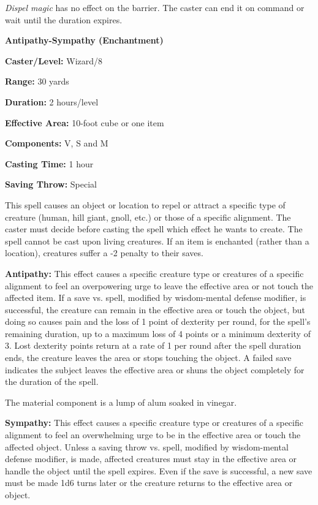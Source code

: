 \begin{multicols}{2}
\textit{Dispel magic} has no effect on the barrier.  The caster can end it on command or wait until the duration expires.

\vspace{1em}

\noindent
\begin{minipage}{\columnwidth}

\noindent \textbf{Antipathy-Sympathy (Enchantment)}

\noindent \textbf{Caster/Level:} Wizard/8

\noindent \textbf{Range:} 30 yards

\noindent \textbf{Duration:} 2 hours/level

\noindent \textbf{Effective Area:} 10-foot cube or one item

\noindent \textbf{Components:} V, S and M

\noindent \textbf{Casting Time:} 1 hour

\noindent \textbf{Saving Throw:} Special

\end{minipage}

This spell causes an object or location to repel or attract a specific type of creature (human, hill giant, gnoll, etc.) or those of a specific alignment.  The caster must decide before casting the spell which effect he wants to create.  The spell cannot be cast upon living creatures.  If an item is enchanted (rather than a location), creatures suffer a -2 penalty to their saves.

\textbf{Antipathy:} This effect causes a specific creature type or creatures of a specific alignment to feel an overpowering urge to leave the effective area or not touch the affected item.  If a save vs. spell, modified by wisdom-mental defense modifier, is successful, the creature can remain in the effective area or touch the object, but doing so causes pain and the loss of 1 point of dexterity per round, for the spell's remaining duration, up to a maximum loss of 4 points or a minimum dexterity of 3.  Lost dexterity points return at a rate of 1 per round after the spell duration ends, the creature leaves the area or stops touching the object.  A failed save indicates the subject leaves the effective area or shuns the object completely for the duration of the spell.
 
The material component is a lump of alum soaked in vinegar.

\textbf{Sympathy:} This effect causes a specific creature type or creatures of a specific alignment to feel an overwhelming urge to be in the effective area or touch the affected object.  Unless a saving throw vs. spell, modified by wisdom-mental defense modifier, is made, affected creatures must stay in the effective area or handle the object until the spell expires.  Even if the save is successful, a new save must be made 1d6 turns later or the creature returns to the effective area or object.


\end{multicols}
